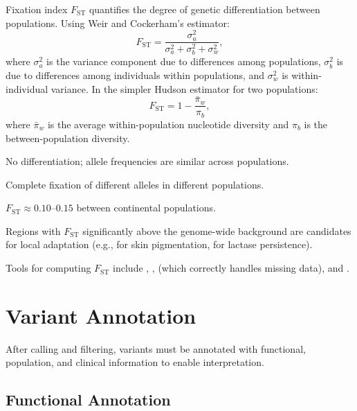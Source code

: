 Fixation index $F_{\text{ST}}$ quantifies the degree of genetic differentiation between populations. Using Weir and Cockerham's estimator:
\begin{equation}
\label{eq:variants:fst}
F_{\text{ST}} = \frac{\sigma_a^2}{\sigma_a^2 + \sigma_b^2 + \sigma_w^2},
\end{equation}
where $\sigma_a^2$ is the variance component due to differences among populations, $\sigma_b^2$ is due to differences among individuals within populations, and $\sigma_w^2$ is within-individual variance. In the simpler Hudson estimator for two populations:
\begin{equation}
\label{eq:variants:fst_hudson}
F_{\text{ST}} = 1 - \frac{\bar{\pi}_w}{\pi_b},
\end{equation}
where $\bar{\pi}_w$ is the average within-population nucleotide diversity and $\pi_b$ is the between-population diversity.

\begin{description}[nosep]
  \item[$F_{\text{ST}} \approx 0$] No differentiation; allele frequencies are similar across populations.
  \item[$F_{\text{ST}} \approx 1$] Complete fixation of different alleles in different populations.
  \item[Genome-wide average in humans] $F_{\text{ST}} \approx 0.10$--$0.15$ between continental populations.
  \item[Outlier loci] Regions with $F_{\text{ST}}$ significantly above the genome-wide background are candidates for local adaptation (e.g.,  for skin pigmentation,  for lactase persistence).
\end{description}

Tools for computing $F_{\text{ST}}$ include , ,  (which correctly handles missing data), and .

\section{Variant Annotation}
\label{sec:annotation}

After calling and filtering, variants must be annotated with functional, population, and clinical information to enable interpretation.

\subsection{Functional Annotation}

